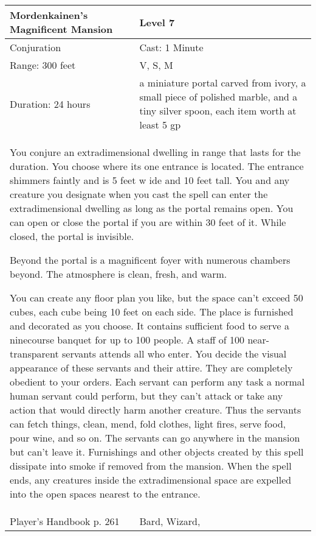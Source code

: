 \documentclass[11pt]{report}
\begin{document}
\begin{table}[H]
	\begin{tabular}{||p{6cm}|p{6cm}||}
		\hline\hline
		\bf{Mordenkainen’s Magnificent Mansion} & Level 7\\ \hline
		Conjuration & Cast: 1 Minute\\ \hline
		Range: 300 feet & V, S, M\\ \hline
		Duration: 24 hours & a miniature portal carved from ivory, a small piece of polished marble, and a tiny silver spoon, each item worth at least 5 gp\\ \hline
		\multicolumn{2}{||p{12cm}||}{You conjure an extradimensional dwelling in range that lasts for the duration.
You choose where its one entrance is located. The entrance shimmers faintly and is 5 feet w ide and 10 feet tall. You and any creature you designate when you cast the spell can enter the extradimensional dwelling as long as the portal remains open. You can open or close the portal if you are within 30 feet of it. While closed, the portal is invisible.

Beyond the portal is a magnificent foyer with numerous chambers beyond. The atmosphere is clean, fresh, and warm.

You can create any floor plan you like, but the space can’t exceed 50 cubes, each cube being 10 feet on each side. The place is furnished and decorated as you choose. It contains sufficient food to serve a ninecourse banquet for up to 100 people. A staff of 100 near-transparent servants attends all who enter. You decide the visual appearance of these servants and their attire. They are completely obedient to your orders. Each servant can perform any task a normal human servant could perform, but they can’t attack or take any action that would directly harm another creature. Thus the servants can fetch things, clean, mend, fold clothes, light fires, serve food, pour wine, and so on. The servants can go anywhere in the mansion but can’t leave it. Furnishings and other objects created by this spell dissipate into smoke if removed from the mansion. When the spell ends, any creatures inside the extradimensional space are expelled into the open spaces nearest to the entrance.}\\ \hline
Player's Handbook p. 261 & Bard, Wizard, \\ \hline\hline
	\end{tabular}
\end{table}
\end{document}
